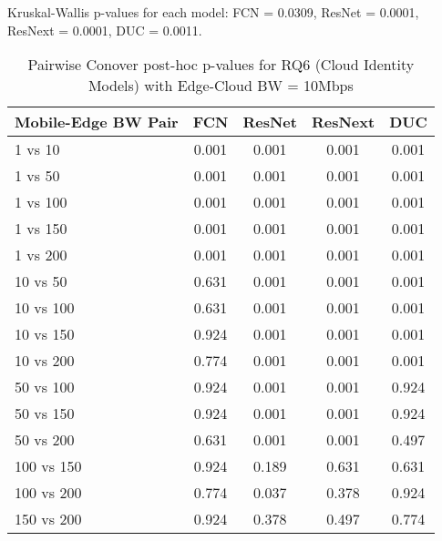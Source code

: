 \begin{table}[h]
\centering
\caption{Pairwise Conover post-hoc p-values for RQ6 (Cloud Identity Models) with Edge-Cloud BW = 10Mbps}
\label{tab:conover_cloud_identity_ec10}
\smallskip
Kruskal-Wallis p-values for each model: FCN = 0.0309, ResNet = 0.0001, ResNext = 0.0001, DUC = 0.0011.

\begin{tabular}{lcccc}
\toprule
Mobile-Edge BW Pair & FCN & ResNet & ResNext & DUC \\
\midrule
1 vs 10 & 0.001 & 0.001 & 0.001 & 0.001 \\
1 vs 50 & 0.001 & 0.001 & 0.001 & 0.001 \\
1 vs 100 & 0.001 & 0.001 & 0.001 & 0.001 \\
1 vs 150 & 0.001 & 0.001 & 0.001 & 0.001 \\
1 vs 200 & 0.001 & 0.001 & 0.001 & 0.001 \\
10 vs 50 & 0.631 & 0.001 & 0.001 & 0.001 \\
10 vs 100 & 0.631 & 0.001 & 0.001 & 0.001 \\
10 vs 150 & 0.924 & 0.001 & 0.001 & 0.001 \\
10 vs 200 & 0.774 & 0.001 & 0.001 & 0.001 \\
50 vs 100 & 0.924 & 0.001 & 0.001 & 0.924 \\
50 vs 150 & 0.924 & 0.001 & 0.001 & 0.924 \\
50 vs 200 & 0.631 & 0.001 & 0.001 & 0.497 \\
100 vs 150 & 0.924 & 0.189 & 0.631 & 0.631 \\
100 vs 200 & 0.774 & 0.037 & 0.378 & 0.924 \\
150 vs 200 & 0.924 & 0.378 & 0.497 & 0.774 \\
\bottomrule
\end{tabular}
\end{table}

